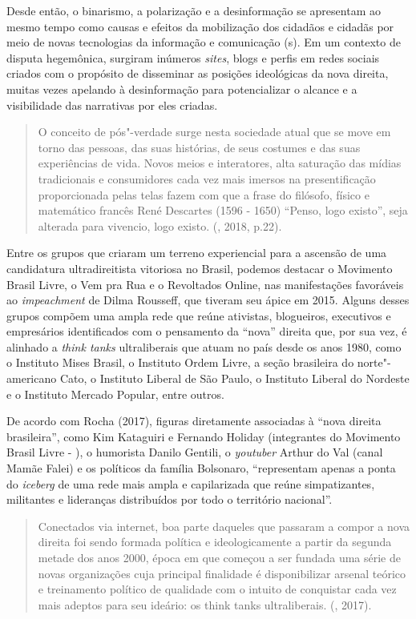 Desde então, o binarismo, a polarização e a desinformação se apresentam
ao mesmo tempo como causas e efeitos da mobilização dos cidadãos e
cidadãs por meio de novas tecnologias da informação e comunicação
(s). Em um contexto de disputa hegemônica, surgiram inúmeros
\emph{sites}, blogs e perfis em redes sociais criados com o propósito de
disseminar as posições ideológicas da nova direita, muitas vezes
apelando à desinformação para potencializar o alcance e a visibilidade
das narrativas por eles criadas.

\begin{quote}
O conceito de pós"-verdade surge nesta sociedade atual que se move em
torno das pessoas, das suas histórias, de seus costumes e das suas
experiências de vida. Novos meios e interatores, alta saturação das
mídias tradicionais e consumidores cada vez mais imersos na
presentificação proporcionada pelas telas fazem com que a frase do
filósofo, físico e matemático francês René Descartes (1596 - 1650)
``Penso, logo existo'', seja alterada para vivencio, logo existo.
(, 2018, p.22).
\end{quote}

Entre os grupos que criaram um terreno experiencial para a ascensão de
uma candidatura ultradireitista vitoriosa no Brasil, podemos destacar o
Movimento Brasil Livre, o Vem pra Rua e o Revoltados Online, nas
manifestações favoráveis ao \emph{impeachment} de Dilma Rousseff, que
tiveram seu ápice em 2015. Alguns desses grupos compõem uma ampla rede
que reúne ativistas, blogueiros, executivos e empresários identificados
com o pensamento da ``nova'' direita que, por sua vez, é alinhado a
\emph{think tanks} ultraliberais que atuam no país desde os anos 1980,
como o Instituto Mises Brasil, o Instituto Ordem Livre, a seção
brasileira do norte"-americano Cato, o Instituto Liberal de São Paulo, o
Instituto Liberal do Nordeste e o Instituto Mercado Popular, entre
outros.

De acordo com Rocha (2017), figuras diretamente associadas à ``nova
direita brasileira'', como Kim Kataguiri e Fernando Holiday (integrantes
do Movimento Brasil Livre - ), o humorista Danilo Gentili, o
\emph{youtuber} Arthur do Val (canal Mamãe Falei) e os políticos da
família Bolsonaro, ``representam apenas a ponta do \emph{iceberg} de uma
rede mais ampla e capilarizada que reúne simpatizantes, militantes e
lideranças distribuídos por todo o território nacional''.

\begin{quote}
Conectados via internet, boa parte daqueles que passaram a compor a nova
direita foi sendo formada política e ideologicamente a partir da segunda
metade dos anos 2000, época em que começou a ser fundada uma série de
novas organizações cuja principal finalidade é disponibilizar arsenal
teórico e treinamento político de qualidade com o intuito de conquistar
cada vez mais adeptos para seu ideário: os think tanks ultraliberais.
(, 2017).
\end{quote}

